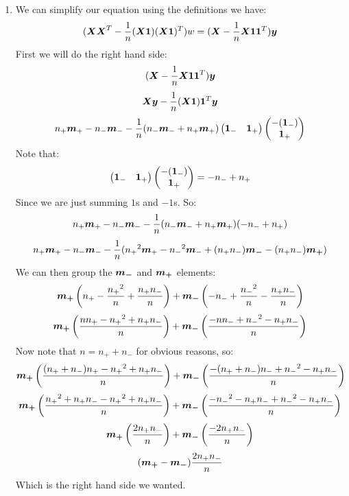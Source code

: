 \documentclass[12pt]{article}
\begin{document}
\begin{enumerate}[label = \letters]
    \item 
    We can simplify our equation
    using the definitions we have:
    \[ (\boldsymbol{X}\boldsymbol{X}^T - \dfrac{1}{n}(\boldsymbol{X}\boldsymbol{1})(\boldsymbol{X}\boldsymbol{1})^T) w
    = (\boldsymbol{X} - \dfrac{1}{n}\boldsymbol{X}\boldsymbol{1} \boldsymbol{1}^T) \boldsymbol{y} \]
    First we will do the right hand side:
    \[ (\boldsymbol{X} - \dfrac{1}{n}\boldsymbol{X}\boldsymbol{1} \boldsymbol{1}^T) \boldsymbol{y} \]
    \[ \boldsymbol{X}\boldsymbol{y} - \dfrac{1}{n}(\boldsymbol{X}\boldsymbol{1}) \boldsymbol{1}^T \boldsymbol{y} \]
    \[ n_+\boldsymbol{m}_+ - n_-\boldsymbol{m}_- 
    - \dfrac{1}{n}(n_-\boldsymbol{m}_- + n_+\boldsymbol{m}_+) 
    \begin{pmatrix} \boldsymbol{1}_- & \boldsymbol{1}_+ \end{pmatrix}\begin{pmatrix} -(\boldsymbol{1}_-) \\ \boldsymbol{1}_+ \end{pmatrix} \]
    Note that:
    \[ \begin{pmatrix} \boldsymbol{1}_- & \boldsymbol{1}_+ \end{pmatrix}\begin{pmatrix} -(\boldsymbol{1}_-) \\ \boldsymbol{1}_+ \end{pmatrix}
    = -n_- + n_+ \]
    Since we are just summing $1$s and $-1$s. So:
    \[ n_+\boldsymbol{m}_+ - n_-\boldsymbol{m}_-
    - \dfrac{1}{n}(n_-\boldsymbol{m}_- + n_+\boldsymbol{m}_+)(-n_- + n_+) \]
    \[ n_+\boldsymbol{m}_+ - n_-\boldsymbol{m}_-
    - \dfrac{1}{n}({n_+}^2\boldsymbol{m}_+ - {n_-}^2\boldsymbol{m}_-
    + (n_+n_-)\boldsymbol{\boldsymbol{m_-}} - (n_+n_-)\boldsymbol{\boldsymbol{m_+}} ) \]
    We can then group the $\boldsymbol{\boldsymbol{m_-}}$ and $\boldsymbol{\boldsymbol{m_+}}$ elements:
    \[ \boldsymbol{\boldsymbol{m_+}} \left( n_+ - \dfrac{{n_+}^2}{n} + \dfrac{n_+n_-}{n} \right)
    + \boldsymbol{\boldsymbol{m_-}} \left( -n_- + \dfrac{{n_-}^2}{n} - \dfrac{n_+n_-}{n} \right) \]
    \[ \boldsymbol{\boldsymbol{m_+}} \left( \dfrac{nn_+ - {n_+}^2 + n_+n_-}{n} \right)
    + \boldsymbol{\boldsymbol{m_-}} \left( \dfrac{-nn_- + {n_-}^2 - n_+n_-}{n} \right) \]
    Now note that $n = n_+ + n_-$ for obvious reasons, so:
    \[ \boldsymbol{\boldsymbol{m_+}} \left( \dfrac{(n_+ + n_-)n_+ - {n_+}^2 + n_+n_-}{n} \right)
    + \boldsymbol{\boldsymbol{m_-}} \left( \dfrac{-(n_+ + n_-)n_- + {n_-}^2 - n_+n_-}{n} \right) \]
    \[ \boldsymbol{\boldsymbol{m_+}} \left( \dfrac{{n_+}^2 + n_+n_- - {n_+}^2 + n_+n_-}{n} \right)
    + \boldsymbol{\boldsymbol{m_-}} \left( \dfrac{-{n_-}^2 - n_+n_- + {n_-}^2 - n_+n_-}{n} \right) \]
    \[ \boldsymbol{\boldsymbol{m_+}} \left( \dfrac{2n_+n_-}{n} \right)
    + \boldsymbol{\boldsymbol{m_-}} \left( \dfrac{-2n_+n_-}{n} \right) \]
    \[ (\boldsymbol{\boldsymbol{m_+}} - \boldsymbol{\boldsymbol{m_-}})\dfrac{2n_+n_-}{n} \]
    Which is the right hand side we wanted. \\


\end{enumerate}
\end{document}
